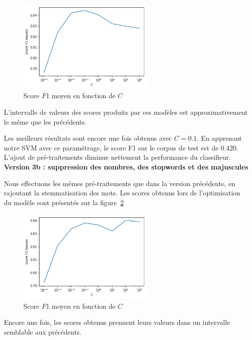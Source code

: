 \documentclass[a4paper]{article}
\newcommand{\figref}[1]{figure~\ref{#1}}
\begin{document}
\begin{figure}[H]
	\center 
	\includegraphics[width=0.6\textwidth]{images/tme2/task1_v2a.png}
    \caption{Score $F1$ moyen en fonction de $C$}
    \label{img:tme2-task1-v2}
\end{figure}

L'intervalle de valeurs des scores produits par ces modèles est
approximativement le même que les précédents. 

Les meilleurs résultats sont encore une fois obtenus avec $C=0.1$. En apprenant
notre SVM avec ce paramétrage, le score F1 sur le corpus de test est de $0.420$.
L'ajout de pré-traitements diminue nettement la performance du classifieur. \\

\textbf{Version 3b : suppression des nombres, des stopwords et des majuscules}

Nous effectuons les mêmes pré-traitements que dans la version précédente, en
rajoutant la stemmatisation des mots. Les scores obtenus lors
de l'optimisation du modèle sont présentés sur la \figref{img:tme2-task1-v1b}

\begin{figure}[H]
	\center 
	\includegraphics[width=0.6\textwidth]{images/tme2/task1_v2b.png}
    \caption{Score $F1$ moyen en fonction de $C$}
    \label{img:tme2-task1-v1b}
\end{figure}

Encore une fois, les scores obtenus prennent leurs valeurs dans un intervalle
semblable aux précédents.
\end{document}
